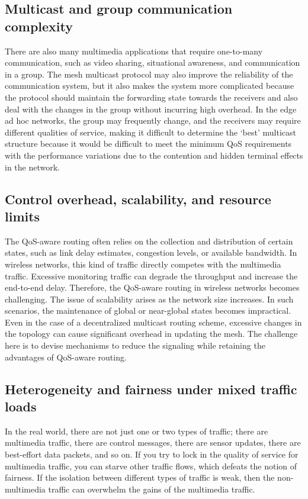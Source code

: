 \documentclass[12pt]{article}
\begin{document}
    \subsection{Multicast and group communication complexity}
    There are also many multimedia applications that require one-to-many communication, such as video sharing, situational awareness, and communication in a group. The mesh multicast protocol may also improve the reliability of the communication system, but it also makes the system more complicated because the protocol should maintain the forwarding state towards the receivers and also deal with the changes in the group without incurring high overhead. In the edge ad hoc networks, the group may frequently change, and the receivers may require different qualities of service, making it difficult to determine the ‘best’ multicast structure because it would be difficult to meet the minimum QoS requirements with the performance variations due to the contention and hidden terminal effects in the network.
    \subsection{Control overhead, scalability, and resource limits}
	The QoS-aware routing often relies on the collection and distribution of certain states, such as link delay estimates, congestion levels, or available bandwidth. In wireless networks, this kind of traffic directly competes with the multimedia traffic. Excessive monitoring traffic can degrade the throughput and increase the end-to-end delay. Therefore, the QoS-aware routing in wireless networks becomes challenging. The issue of scalability arises as the network size increases. In such scenarios, the maintenance of global or near-global states becomes impractical. Even in the case of a decentralized multicast routing scheme, excessive changes in the topology can cause significant overhead in updating the mesh. The challenge here is to devise mechanisms to reduce the signaling while retaining the advantages of QoS-aware routing.
    \subsection{Heterogeneity and fairness under mixed traffic loads}
    In the real world, there are not just one or two types of traffic; there are multimedia traffic, there are control messages, there are sensor updates, there are best-effort data packets, and so on. If you try to lock in the quality of service for multimedia traffic, you can starve other traffic flows, which defeats the notion of fairness. If the isolation between different types of traffic is weak, then the non-multimedia traffic can overwhelm the gains of the multimedia traffic.
\end{document}
